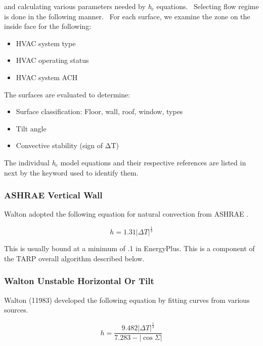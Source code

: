and calculating various parameters needed by \emph{h\(_{c}\)} equations.~ Selecting flow regime is done in the following manner.~ For each surface, we examine the zone on the inside face for the following:

\begin{itemize}
\item
  HVAC system type
\item
  HVAC operating status
\item
  HVAC system ACH
\end{itemize}

The surfaces are evaluated to determine:

\begin{itemize}
\item
  Surface classification: Floor, wall, roof, window, types
\item
  Tilt angle
\item
  Convective stability (sign of ΔT)
\end{itemize}

The individual \emph{h\(_{c}\)} model equations and their respective references are listed in next by the keyword used to identify them.

\subsubsection{ASHRAE Vertical Wall}\label{ashrae-vertical-wall}

Walton adopted the following equation for natural convection from ASHRAE .

\begin{equation}
h = 1.31{\left| {\Delta T} \right|^{\frac{1}{3}}}
\end{equation}

This is usually bound at a minimum of .1 in EnergyPlus. This is a component of the TARP overall algorithm described below.

\subsubsection{Walton Unstable Horizontal Or Tilt}\label{walton-unstable-horizontal-or-tilt}

Walton (11983) developed the following equation by fitting curves from various sources.

\begin{equation}
h = \frac{{9.482{{\left| {\Delta T} \right|}^{\frac{1}{3}}}}}{{7.283 - \left| {\cos \Sigma } \right|}}
\end{equation}

